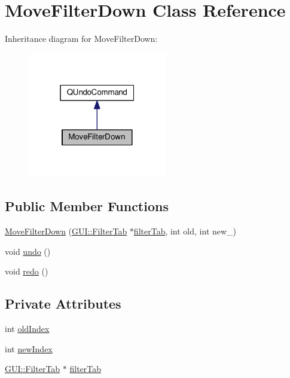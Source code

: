 \hypertarget{classUndoRedo_1_1MoveFilterDown}{}\section{Move\+Filter\+Down Class Reference}
\label{classUndoRedo_1_1MoveFilterDown}


Inheritance diagram for Move\+Filter\+Down\+:
\nopagebreak
\begin{figure}[H]
\begin{center}
\leavevmode
\includegraphics[width=172pt]{classUndoRedo_1_1MoveFilterDown__inherit__graph}
\end{center}
\end{figure}
\subsection*{Public Member Functions}
\begin{DoxyCompactItemize}
\item 
\hyperlink{classUndoRedo_1_1MoveFilterDown_a9900bf77c93eacdc48326900187be946}{Move\+Filter\+Down} (\hyperlink{classGUI_1_1FilterTab}{G\+U\+I\+::\+Filter\+Tab} $\ast$\hyperlink{classUndoRedo_1_1MoveFilterDown_a47ca82534a740774d79998759818d9f4}{filter\+Tab}, int old, int new\+\_)
\item 
void \hyperlink{classUndoRedo_1_1MoveFilterDown_a0e1e7804a53f6d62efc72c9bdbec8571}{undo} ()
\item 
void \hyperlink{classUndoRedo_1_1MoveFilterDown_a93c48d6ed036e1a381be53ac67643284}{redo} ()
\end{DoxyCompactItemize}
\subsection*{Private Attributes}
\begin{DoxyCompactItemize}
\item 
int \hyperlink{classUndoRedo_1_1MoveFilterDown_aafdfcd92ee5fcb81a8ce268be0f53466}{old\+Index}
\item 
int \hyperlink{classUndoRedo_1_1MoveFilterDown_a12457b7d335917daf42dba277962d6b2}{new\+Index}
\item 
\hyperlink{classGUI_1_1FilterTab}{G\+U\+I\+::\+Filter\+Tab} $\ast$ \hyperlink{classUndoRedo_1_1MoveFilterDown_a47ca82534a740774d79998759818d9f4}{filter\+Tab}
\end{DoxyCompactItemize}


